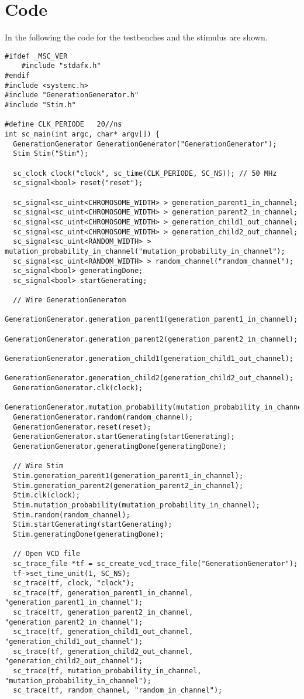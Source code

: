 \section{Code}

In the following the code for the testbenches and the stimulus are shown.

\begin{lstlisting}[style=customc++,caption={Testbench for GenerationGenerator},label={lst:generatorTestbench}]
#ifdef _MSC_VER
	#include "stdafx.h"
#endif
#include <systemc.h>
#include "GenerationGenerator.h"
#include "Stim.h"

#define CLK_PERIODE   20//ns
int sc_main(int argc, char* argv[]) {
  GenerationGenerator GenerationGenerator("GenerationGenerator");
  Stim Stim("Stim");
  
  sc_clock clock("clock", sc_time(CLK_PERIODE, SC_NS)); // 50 MHz
  sc_signal<bool> reset("reset");

  sc_signal<sc_uint<CHROMOSOME_WIDTH> > generation_parent1_in_channel;
  sc_signal<sc_uint<CHROMOSOME_WIDTH> > generation_parent2_in_channel;
  sc_signal<sc_uint<CHROMOSOME_WIDTH> > generation_child1_out_channel;
  sc_signal<sc_uint<CHROMOSOME_WIDTH> > generation_child2_out_channel;
  sc_signal<sc_uint<RANDOM_WIDTH> > mutation_probability_in_channel("mutation_probability_in_channel");
  sc_signal<sc_uint<RANDOM_WIDTH> > random_channel("random_channel");
  sc_signal<bool> generatingDone;
  sc_signal<bool> startGenerating;

  // Wire GenerationGeneraton
  GenerationGenerator.generation_parent1(generation_parent1_in_channel);
  GenerationGenerator.generation_parent2(generation_parent2_in_channel);
  GenerationGenerator.generation_child1(generation_child1_out_channel);
  GenerationGenerator.generation_child2(generation_child2_out_channel);
  GenerationGenerator.clk(clock);
  GenerationGenerator.mutation_probability(mutation_probability_in_channel);
  GenerationGenerator.random(random_channel);
  GenerationGenerator.reset(reset);
  GenerationGenerator.startGenerating(startGenerating);
  GenerationGenerator.generatingDone(generatingDone);

  // Wire Stim
  Stim.generation_parent1(generation_parent1_in_channel);
  Stim.generation_parent2(generation_parent2_in_channel);
  Stim.clk(clock);
  Stim.mutation_probability(mutation_probability_in_channel);
  Stim.random(random_channel);
  Stim.startGenerating(startGenerating);
  Stim.generatingDone(generatingDone);

  // Open VCD file
  sc_trace_file *tf = sc_create_vcd_trace_file("GenerationGenerator");
  tf->set_time_unit(1, SC_NS);
  sc_trace(tf, clock, "clock");
  sc_trace(tf, generation_parent1_in_channel, "generation_parent1_in_channel");
  sc_trace(tf, generation_parent2_in_channel, "generation_parent2_in_channel");
  sc_trace(tf, generation_child1_out_channel, "generation_child1_out_channel");
  sc_trace(tf, generation_child2_out_channel, "generation_child2_out_channel");
  sc_trace(tf, mutation_probability_in_channel, "mutation_probability_in_channel");
  sc_trace(tf, random_channel, "random_in_channel");
  

\end{lstlisting}
